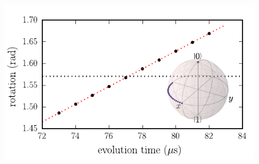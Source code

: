 \begin{figure}[H]
	\caption[oddeven]{}
	\label{FIG:evolution}
\end{figure}


\begin{figure}[H]
	\includegraphics[width=\linewidth]{../Figures/abrupt_find_tau_full.pdf}
		\caption{}
		\label{fig:abrupt_tau}

\end{figure}


